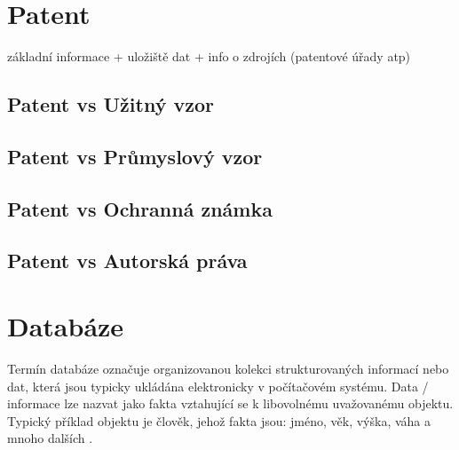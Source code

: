 \chapter{Patent}
základní informace + uložiště dat + info o zdrojích (patentové úřady atp) \newline
\section{Patent vs Užitný vzor}
\section{Patent vs Průmyslový vzor}
\section{Patent vs Ochranná známka}
\section{Patent vs Autorská práva}



\chapter{Databáze} \label{chap:databaze}

Termín databáze označuje organizovanou kolekci strukturovaných informací nebo dat, která jsou typicky ukládána elektronicky v počítačovém systému. Data / informace lze nazvat jako fakta vztahující se k libovolnému uvažovanému objektu. Typický příklad objektu je člověk, jehož fakta jsou: jméno, věk, výška, váha a mnoho dalších \cite{guru99Database}.\newline

